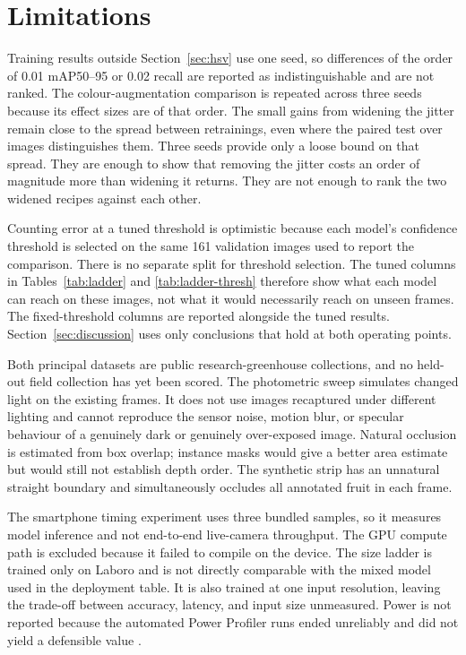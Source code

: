 \section{Limitations}
\label{sec:limitations}

Training results outside Section~\ref{sec:hsv} use one seed, so differences of
the order of 0.01 mAP50--95 or 0.02 recall are reported as indistinguishable
and are not ranked. The colour-augmentation comparison is repeated across three
seeds because its effect sizes are of that order. The small gains from widening
the jitter remain close to the spread between retrainings, even where the paired
test over images distinguishes them. Three seeds provide only a loose bound on
that spread. They are enough to show that removing the jitter costs an order of
magnitude more than widening it returns. They are not enough to rank the two
widened recipes against each other.

Counting error at a tuned threshold is optimistic because each model's
confidence threshold is selected on the same 161 validation images used to
report the comparison. There is no separate split for threshold selection. The
tuned columns in Tables~\ref{tab:ladder} and \ref{tab:ladder-thresh} therefore
show what each model can reach on these images, not what it would necessarily
reach on unseen frames. The fixed-threshold columns are reported alongside the
tuned results. Section~\ref{sec:discussion} uses only conclusions that hold at
both operating points.

Both principal datasets are public research-greenhouse collections, and no
held-out field collection has yet been scored. The photometric sweep simulates
changed light on the existing frames. It does not use images recaptured under
different lighting and cannot reproduce the sensor noise, motion blur, or
specular behaviour of a genuinely dark or genuinely over-exposed image.
Natural occlusion is estimated from box overlap; instance masks would give a
better area estimate but would still not establish depth order. The synthetic
strip has an unnatural straight boundary and simultaneously occludes all
annotated fruit in each frame.

The smartphone timing experiment uses three bundled samples, so it measures
model inference and not end-to-end live-camera throughput. The GPU compute path
is excluded because it failed to compile on the device. The size ladder is
trained only on Laboro and is not directly comparable with the mixed model used
in the deployment table. It is also trained at one input resolution, leaving
the trade-off between accuracy, latency, and input size unmeasured. Power is not
reported because the automated Power Profiler runs ended unreliably and did not
yield a defensible value \cite{apple2026powerprofiler}.
